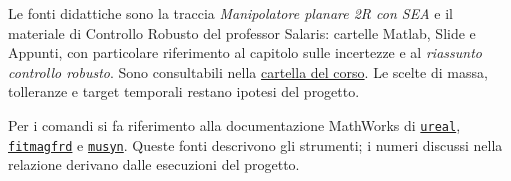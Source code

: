 Le fonti didattiche sono la traccia \emph{Manipolatore planare 2R con SEA} e il materiale di Controllo Robusto del professor Salaris: cartelle Matlab, Slide e Appunti, con particolare riferimento al capitolo sulle incertezze e al \emph{riassunto controllo robusto}. Sono consultabili nella \href{https://drive.google.com/drive/folders/1IlimFEVGqS3JxOgKLfhpptMeCBRPsZXQ}{cartella del corso}. Le scelte di massa, tolleranze e target temporali restano ipotesi del progetto.

Per i comandi si fa riferimento alla documentazione MathWorks di \href{https://www.mathworks.com/help/robust/ref/ureal.html}{\texttt{ureal}}, \href{https://www.mathworks.com/help/robust/ref/fitmagfrd.html}{\texttt{fitmagfrd}} e \href{https://www.mathworks.com/help/robust/ref/uss.musyn.html}{\texttt{musyn}}. Queste fonti descrivono gli strumenti; i numeri discussi nella relazione derivano dalle esecuzioni del progetto.
